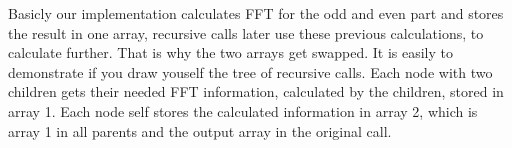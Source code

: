 Basicly our implementation calculates FFT for the odd and even part and stores the result in one array, recursive calls later use these previous calculations, to calculate further. That is why the two arrays get swapped. It is easily to demonstrate if you draw youself the tree of recursive calls. Each node with two children gets their needed FFT information, calculated by the children, stored in array 1. Each node self stores the calculated information in array 2, which
is array 1 in all parents and the output array in the original call. 